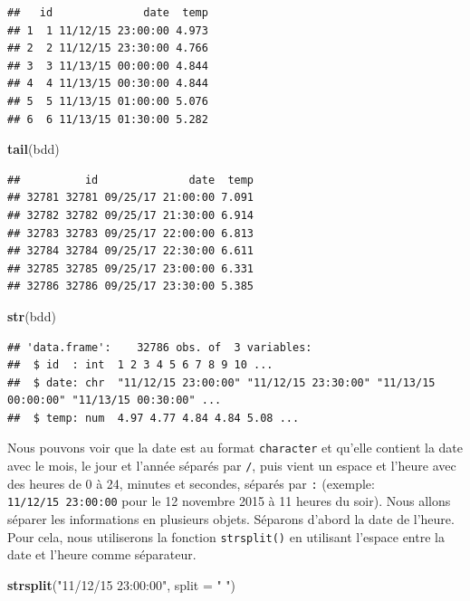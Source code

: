\documentclass[
]{book}
\newenvironment{Shaded}{\begin{snugshade}}{\end{snugshade}}
\newcommand{\DataTypeTok}[1]{\textcolor[rgb]{0.13,0.29,0.53}{#1}}
\newcommand{\KeywordTok}[1]{\textcolor[rgb]{0.13,0.29,0.53}{\textbf{#1}}}
\newcommand{\NormalTok}[1]{#1}
\newcommand{\StringTok}[1]{\textcolor[rgb]{0.31,0.60,0.02}{#1}}
\begin{document}
\begin{verbatim}
##   id              date  temp
## 1  1 11/12/15 23:00:00 4.973
## 2  2 11/12/15 23:30:00 4.766
## 3  3 11/13/15 00:00:00 4.844
## 4  4 11/13/15 00:30:00 4.844
## 5  5 11/13/15 01:00:00 5.076
## 6  6 11/13/15 01:30:00 5.282
\end{verbatim}

\begin{Shaded}
\begin{Highlighting}[]
\KeywordTok{tail}\NormalTok{(bdd)}
\end{Highlighting}
\end{Shaded}

\begin{verbatim}
##          id              date  temp
## 32781 32781 09/25/17 21:00:00 7.091
## 32782 32782 09/25/17 21:30:00 6.914
## 32783 32783 09/25/17 22:00:00 6.813
## 32784 32784 09/25/17 22:30:00 6.611
## 32785 32785 09/25/17 23:00:00 6.331
## 32786 32786 09/25/17 23:30:00 5.385
\end{verbatim}

\begin{Shaded}
\begin{Highlighting}[]
\KeywordTok{str}\NormalTok{(bdd)}
\end{Highlighting}
\end{Shaded}

\begin{verbatim}
## 'data.frame':    32786 obs. of  3 variables:
##  $ id  : int  1 2 3 4 5 6 7 8 9 10 ...
##  $ date: chr  "11/12/15 23:00:00" "11/12/15 23:30:00" "11/13/15 00:00:00" "11/13/15 00:30:00" ...
##  $ temp: num  4.97 4.77 4.84 4.84 5.08 ...
\end{verbatim}

Nous pouvons voir que la date est au format \texttt{character} et qu'elle contient la date avec le mois, le jour et l'année séparés par \texttt{/}, puis vient un espace et l'heure avec des heures de 0 à 24, minutes et secondes, séparés par \texttt{:} (exemple: \texttt{11/12/15\ 23:00:00} pour le 12 novembre 2015 à 11 heures du soir). Nous allons séparer les informations en plusieurs objets. Séparons d'abord la date de l'heure. Pour cela, nous utiliserons la fonction \texttt{strsplit()} en utilisant l'espace entre la date et l'heure comme séparateur.

\begin{Shaded}
\begin{Highlighting}[]
\KeywordTok{strsplit}\NormalTok{(}\StringTok{"11/12/15 23:00:00"}\NormalTok{, }\DataTypeTok{split =} \StringTok{" "}\NormalTok{)}
\end{Highlighting}
\end{Shaded}
\end{document}
